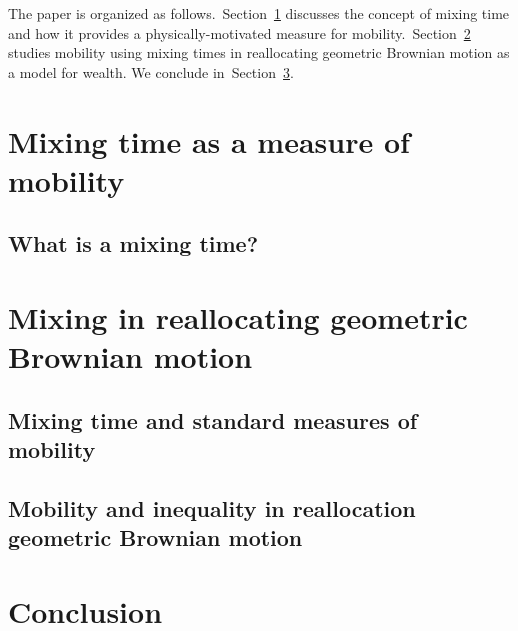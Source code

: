 \documentclass[11pt]{article}
\newcommand{\Sref}[1]{Section~\ref{sec:#1}}
\numberwithin{equation}{section}
\begin{document}
The paper is organized as follows.~\Sref{mixingtime} discusses the concept of mixing time and how it provides a physically-motivated measure for mobility.~\Sref{rgbm} studies mobility using mixing times in reallocating geometric Brownian motion as a model for wealth. We conclude in~\Sref{conclusion}.

\section{Mixing time as a measure of mobility}\label{sec:mixingtime}

\subsection{What is a mixing time?}\label{sec:what}

\section{Mixing in reallocating geometric Brownian motion}\label{sec:rgbm}

\subsection{Mixing time and standard measures of mobility}\label{sec:measures}

\subsection{Mobility and inequality in reallocation geometric Brownian motion}\label{sec:inequality}

\section{Conclusion}\label{sec:conclusion}






\end{document}
